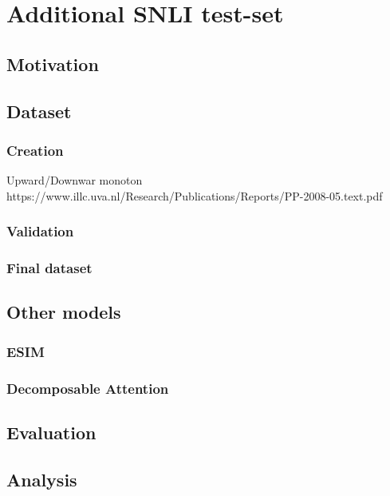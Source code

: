 \section{Additional SNLI test-set}\label{sec:additional_snli_set}
\subsection{Motivation}
\subsection{Dataset}
\subsubsection{Creation}
Upward/Downwar monoton \citep{maccartney2007natural} \citep{cooper1996role} https://www.illc.uva.nl/Research/Publications/Reports/PP-2008-05.text.pdf
\subsubsection{Validation}
\subsubsection{Final dataset}
\subsection{Other models}
\subsubsection{ESIM}
\subsubsection{Decomposable Attention}
\subsection{Evaluation}
\subsection{Analysis}
